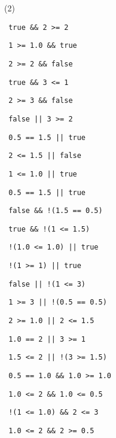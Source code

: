\begin{exercise}

\begin{sltasks}[resume=true](2)
  \task
  \begin{items}
    \item \texttt{ true \&\& 2 >= 2 }
    \item \texttt{ 1 >= 1.0 \&\& true }
    \item \texttt{ 2 >= 2 \&\& false }
    \item \texttt{ true \&\& 3 <= 1 }
    \item \texttt{ 2 >= 3 \&\& false }
  \end{items}
  \task
  \begin{items}
    \item \texttt{ false || 3 >= 2 }
    \item \texttt{ 0.5 == 1.5 || true }
    \item \texttt{ 2 <= 1.5 || false }
    \item \texttt{ 1 <= 1.0 || true }
    \item \texttt{ 0.5 == 1.5 || true }
  \end{items}
  \task
  \begin{items}
    \item \texttt{ false \&\& !(1.5 == 0.5) }
    \item \texttt{ true \&\& !(1 <= 1.5) }
    \item \texttt{ !(1.0 <= 1.0) || true }
    \item \texttt{ !(1 >= 1) || true }
    \item \texttt{ false || !(1 <= 3) }
  \end{items}
  \task
  \begin{items}
    \item \texttt{ 1 >= 3 || !(0.5 == 0.5) }
    \item \texttt{ 2 >= 1.0 || 2 <= 1.5 }
    \item \texttt{ 1.0 == 2 || 3 >= 1 }
    \item \texttt{ 1.5 <= 2 || !(3 >= 1.5) }
    \item \texttt{ 0.5 == 1.0 \&\& 1.0 >= 1.0 }
  \end{items}
  \task
  \begin{items}
    \item \texttt{ 1.0 <= 2 \&\& 1.0 <= 0.5 }
    \item \texttt{ !(1 <= 1.0) \&\& 2 <= 3 }
    \item \texttt{ 1.0 <= 2 \&\& 2 >= 0.5 }

\end{items}
\end{sltasks}
\end{exercise}
